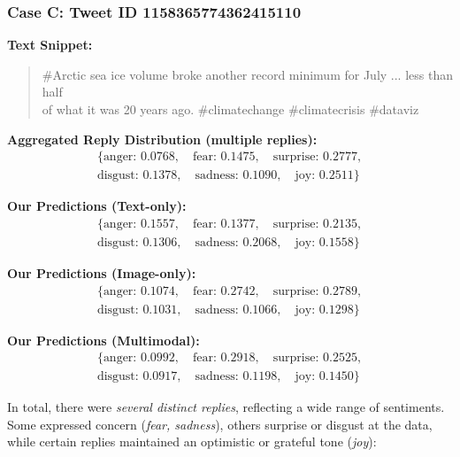 \subsubsection*{Case C: Tweet ID 1158365774362415110}

\noindent\textbf{Text Snippet:}
\begin{quote}
\#Arctic sea ice volume broke another record minimum for July ... less than half \\
of what it was 20 years ago. \#climatechange \#climatecrisis \#dataviz
\end{quote}

\noindent\textbf{Aggregated Reply Distribution (multiple replies):}
\[
\begin{aligned}
\{\text{anger: } 0.0768, \quad \text{fear: } 0.1475, \quad \text{surprise: } 0.2777, \\
\text{disgust: } 0.1378, \quad \text{sadness: } 0.1090, \quad \text{joy: } 0.2511\}
\end{aligned}
\]

\noindent\textbf{Our Predictions (Text-only):}
\[
\begin{aligned}
\{\text{anger: } 0.1557, \quad \text{fear: } 0.1377, \quad \text{surprise: } 0.2135, \\
\text{disgust: } 0.1306, \quad \text{sadness: } 0.2068, \quad \text{joy: } 0.1558\}
\end{aligned}
\]

\noindent\textbf{Our Predictions (Image-only):}
\[
\begin{aligned}
\{\text{anger: } 0.1074, \quad \text{fear: } 0.2742, \quad \text{surprise: } 0.2789, \\
\text{disgust: } 0.1031, \quad \text{sadness: } 0.1066, \quad \text{joy: } 0.1298\}
\end{aligned}
\]

\noindent\textbf{Our Predictions (Multimodal):}
\[
\begin{aligned}
\{\text{anger: } 0.0992, \quad \text{fear: } 0.2918, \quad \text{surprise: } 0.2525, \\
\text{disgust: } 0.0917, \quad \text{sadness: } 0.1198, \quad \text{joy: } 0.1450\}
\end{aligned}
\]

In total, there were \textit{several distinct replies}, reflecting a wide range of sentiments. Some expressed concern (\textit{fear, sadness}), others surprise or disgust at the data, while certain replies maintained an optimistic or grateful tone (\textit{joy}):

